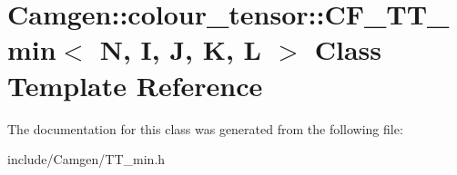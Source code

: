 \hypertarget{a00042}{\section{Camgen\-:\-:colour\-\_\-tensor\-:\-:C\-F\-\_\-\-T\-T\-\_\-min$<$ N, I, J, K, L $>$ Class Template Reference}
\label{a00042}
}


The documentation for this class was generated from the following file\-:\begin{DoxyCompactItemize}
\item 
include/\-Camgen/T\-T\-\_\-min.\-h\end{DoxyCompactItemize}
